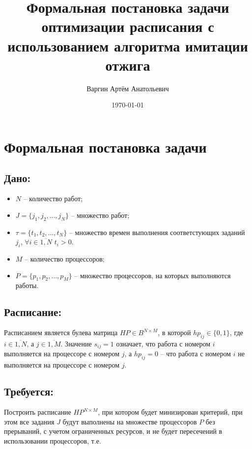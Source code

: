 \documentclass[openany, twoside, a4paper, 12pt]{extbook}
\begin{document}
\title{\textbf{Формальная постановка задачи оптимизации расписания с использованием алгоритма имитации отжига}}
\author{Варгин Артём Анатольевич}
\date{\today}
\maketitle

\newpage
{}
\pagestyle{mystyle}

\section*{Формальная постановка задачи}

    \subsection*{Дано:}
        \begin{itemize}
            \item  $N$ --  количество работ;
            \item $J = \{j_1, j_2, \dots, j_N\}$ -- множество работ;
            \item $\tau  = \{t_1, t_2, \dots, t_N\}$ -- множество времен выполнения соответстующих заданий $j_i$, $\forall i \in \overline{1,N}$ $t_i > 0$.
            \item  $M$ --  количество процессоров;
            \item $P = \{p_1, p_2, \dots, p_M\}$ -- множество процессоров, на которых выполняются работы.
        \end{itemize}
    
    \subsection*{Расписание:}
        Расписанием является булева матрица $HP \in B^{N \times M}$, в которой $hp_{ij} \in \{0, 1\}$, где $i \in \overline{1, N}$, а $j \in \overline{1,  M}$. Значение $s_{ij} = 1$ означает,
        что работа с номером $i$ выполняется на процессоре с номером $j$, а $hp_{ij} = 0$ -- что работа с номером $i$ не выполняется на процессоре с номером $j$.
        

    \subsection*{Требуется:}
        Построить расписание $HP^{N \times M}$, при котором будет минизирован критерий, при этом все задания $J$ будут выполнены на множестве процессоров $P$ без прерываний,
        с учетом ограниченных ресурсов, и не будет пересечений в использовании процессоров, т.е.
\end{document}
